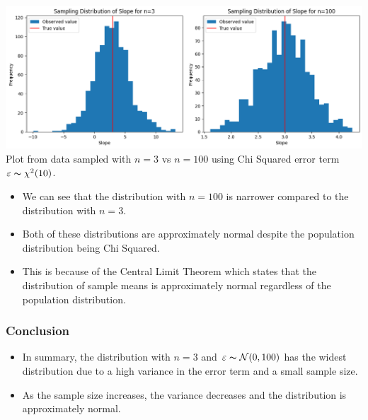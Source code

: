 \documentclass[12pt]{article}
\begin{document}
\newpage
\includegraphics*[width=\linewidth]{graph5d}
Plot from data sampled with \(n = 3\) vs \(n = 100\) using Chi Squared error term
\(\varepsilon \thicksim \chi^2(10)\).
\begin{itemize}
    \item We can see that the distribution with \(n=100\) is narrower compared
    to the distribution with \(n=3\).
    \item Both of these distributions are approximately normal despite the
    population distribution being Chi Squared.
    \item This is because of the Central Limit Theorem which states that the
    distribution of sample means is approximately normal regardless of the
    population distribution.
\end{itemize}
\subsubsection*{Conclusion}
\begin{itemize}
    \item In summary, the distribution with \(n=3\) and \(\varepsilon \thicksim \mathcal{N}(0, 100)\)
    has the widest distribution due to a high variance in the error term and a small sample size.
    \item As the sample size increases, the variance decreases and the distribution
    is approximately normal.
\end{itemize}

\newpage
\end{document}
